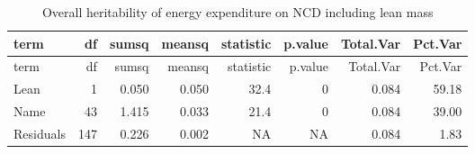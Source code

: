 \documentclass[]{article}
\newenvironment{Shaded}{\begin{snugshade}}{\end{snugshade}}
\newcommand{\DataTypeTok}[1]{\textcolor[rgb]{0.13,0.29,0.53}{#1}}
\newcommand{\DecValTok}[1]{\textcolor[rgb]{0.00,0.00,0.81}{#1}}
\newcommand{\KeywordTok}[1]{\textcolor[rgb]{0.13,0.29,0.53}{\textbf{#1}}}
\newcommand{\NormalTok}[1]{#1}
\newcommand{\OperatorTok}[1]{\textcolor[rgb]{0.81,0.36,0.00}{\textbf{#1}}}
\newcommand{\StringTok}[1]{\textcolor[rgb]{0.31,0.60,0.02}{#1}}
\begin{document}
\begin{longtable}[]{@{}lrrrrrrr@{}}
\caption{Overall heritability of energy expenditure on NCD including
lean mass}\tabularnewline
\toprule
term & df & sumsq & meansq & statistic & p.value & Total.Var &
Pct.Var\tabularnewline
\midrule
\endfirsthead
\toprule
term & df & sumsq & meansq & statistic & p.value & Total.Var &
Pct.Var\tabularnewline
\midrule
\endhead
Lean & 1 & 0.050 & 0.050 & 32.4 & 0 & 0.084 & 59.18\tabularnewline
Name & 43 & 1.415 & 0.033 & 21.4 & 0 & 0.084 & 39.00\tabularnewline
Residuals & 147 & 0.226 & 0.002 & NA & NA & 0.084 & 1.83\tabularnewline
\bottomrule
\end{longtable}

\begin{Shaded}
\end{Shaded}
\end{document}
